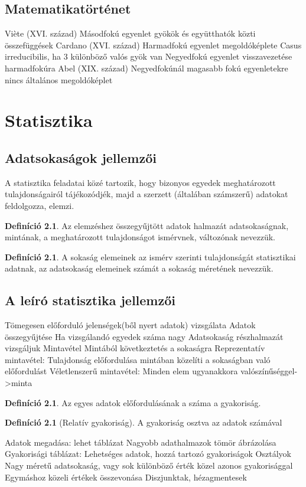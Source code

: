 \documentclass[twoside,12pt]{report}
\theoremstyle{definition}
\newtheorem{definition}[theorem]{Definíció}
\begin{document}
\section{Matematikatörténet}
	\begin{outline}
		\1 Vi\`ete (XVI. század)
			\2 Másodfokú egyenlet gyökök és együtthatók közti összefüggések
		\1 Cardano (XVI. század)
			\2 Harmadfokú egyenlet megoldóképlete
				\3 Casus irreducibilis, ha 3 különböző valós gyök van
			\2 Negyedfokú egyenlet visszavezetése harmadfokúra
		\1 Abel (XIX. század)
			\2 Negyedfokúnál magasabb fokú egyenletekre nincs általános megoldóképlet
	\end{outline}
\chapter{Statisztika}
\section{Adatsokaságok jellemzői}
	A statisztika feladatai közé tartozik, hogy bizonyos egyedek meghatározott tulajdonságairól
	tájékozódjék, majd a szerzett (általában számszerű) adatokat feldolgozza, elemzi.
	\begin{definition}
		Az	elemzéshez összegyűjtött adatok halmazát adatsokaságnak, mintának, a meghatározott tulajdonságot ismérvnek, változónak nevezzük.
	\end{definition}
	\begin{definition}
		A sokaság elemeinek az ismérv szerinti tulajdonságát statisztikai adatnak, az adatsokaság elemeinek számát a sokaság méretének nevezzük.
	\end{definition}
\section{A leíró statisztika jellemzői}
	\begin{outline}
		\1 Tömegesen előforduló jelenségek(ből nyert adatok) vizsgálata
		\1 Adatok összegyűjtése
			\2 Ha vizsgálandó egyedek száma nagy
			\2 Adatsokaság részhalmazát vizsgáljuk
				\3 Mintavétel
				\3 Mintából következtetés a sokaságra
			\2 Reprezentatív mintavétel:
				\3 Tulajdonság előfordulása mintában közelíti a sokaságban való előfordulást
			\2 Véletlenszerű mintavétel:
				\3 Minden elem ugyanakkora valószínűséggel->minta
	\end{outline}
	\begin{definition}
		Az egyes adatok előfordulásának a száma a gyakoriság.
	\end{definition}
	\begin{definition}[Relatív gyakoriság]
		A gyakoriság osztva az adatok számával
	\end{definition}
	\begin{outline}
		\1 Adatok megadása: lehet táblázat
			\2 Nagyobb adathalmazok tömör ábrázolása
			\2 Gyakorisági táblázat: Lehetséges adatok, hozzá tartozó gyakoriságok
		\1 Osztályok
			\2 Nagy méretű adatsokaság, vagy sok különböző érték közel azonos gyakorisággal
			\2 Egymáshoz közeli értékek összevonása
			\2 Diszjunktak, hézagmentesek
	\end{outline}
\end{document}
